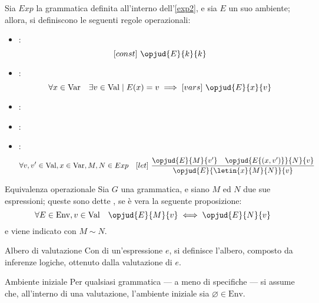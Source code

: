 \documentclass[a4paper, 12pt]{report}
\begin{document}
    \begin{example}
        \label{exp2 clauses}
        Sia $Exp$ la grammatica definita all'interno dell'\cref{exp2}, e sia $E$ un suo ambiente; allora, si definiscono le seguenti regole operazionali:
        
        \begin{itemize}
            \item {}: $$[const] \ \opjud{E}{k}{k}$$
            \item {}: $$\forall x \in \mathrm{Var} \quad \exists v \in \mathrm{Val} \mid E(x) = v \implies [vars] \ \opjud{E}{x}{v}$$
            \item {}: 
            \item {}: 
            \item {}: $$\forall v, v' \in \mathrm{Val}, x \in \mathrm{Var}, M, N \in Exp \quad [let] \ \dfrac{\opjud{E}{M}{v'} \quad \opjud{E\{(x, v')\}}{N}{v}}{\opjud{E}{\letin{x}{M}{N}}{v}}$$
        \end{itemize}
    \end{example}

    \begin{frameddefn}{Equivalenza operazionale}
        Sia $G$ una grammatica, e siano $M$ ed $N$ due sue espressioni; queste sono dette , se è vera la seguente proposizione: $$\forall E \in \mathrm{Env}, v \in \mathrm{Val} \quad \opjud{E}{M}{v} \iff \opjud{E}{N}{v}$$ e viene indicato con $M \sim N$.
    \end{frameddefn}

    \begin{frameddefn}{Albero di valutazione}
        Con  di un'espressione $e$, si definisce l'albero, composto da inferenze logiche, ottenuto dalla valutazione di $e$.
    \end{frameddefn}

    \begin{framedobs}{Ambiente iniziale}
        Per qualsiasi grammatica --- a meno di specifiche --- si assume che, all'interno di una valutazione, l'ambiente iniziale sia $\varnothing \in \mathrm{Env}$.
    \end{framedobs}
\end{document}
